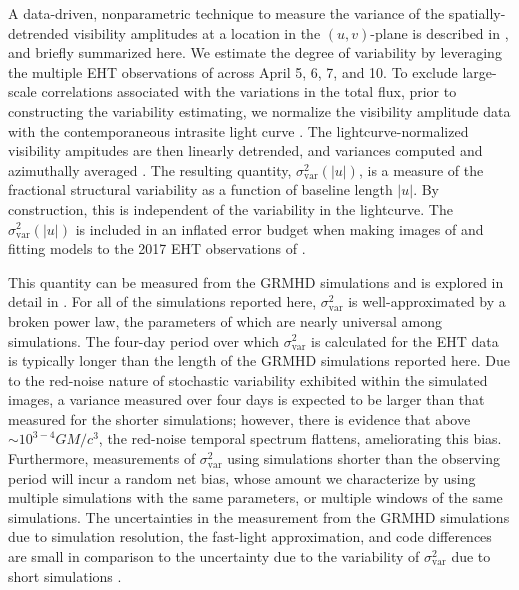 A data-driven, nonparametric technique to measure the variance of the spatially-detrended visibility amplitudes at a location in the $(u,v)$-plane is described in \citet{NoiseModeling}, and briefly summarized here.  We estimate the degree of variability by leveraging the multiple EHT observations of \sgra across April 5, 6, 7, and 10.  To exclude large-scale correlations associated with the variations in the total flux, prior to constructing the variability estimating, we normalize the visibility amplitude data with the contemporaneous intrasite light curve \citep{Georgiev_2022}.  The lightcurve-normalized visibility ampitudes are then linearly detrended, and variances computed and azimuthally averaged \citep{NoiseModeling}.  The resulting quantity, $\sigma_\text{var}^2 (|u|)$, is a measure of the fractional structural variability as a function of baseline length $|u|$.  By construction, this is independent of the variability in the lightcurve.  The $\sigma_\text{var}^2 (|u|)$ is included in an inflated error budget when making images of and fitting models to the 2017 EHT observations of \sgra {}.

This quantity can be measured from the GRMHD simulations and is explored in detail in \citet{Georgiev_2022}. For all of the simulations reported here, $\sigma_\text{var}^2$ is well-approximated by a broken power law, the parameters of which are nearly universal among simulations.
The four-day period over which $\sigma_\text{var}^2$ is calculated for the EHT data is typically longer than the length of the GRMHD simulations reported here. Due to the red-noise nature of stochastic variability exhibited within the simulated images, a variance measured over four days is expected to be larger than that measured for the shorter simulations; however, there is evidence that above $\sim 10^{3-4} GM/c^3$, the red-noise temporal spectrum flattens, ameliorating this bias.
Furthermore, measurements of $\sigma_\text{var}^2$ using simulations shorter than the observing period will incur a random net bias, whose amount we characterize by using multiple simulations with the same parameters, or multiple windows of the same simulations.
The uncertainties in the measurement from the GRMHD simulations due to simulation resolution, the fast-light approximation, and code differences are small in comparison to the uncertainty due to the variability of $\sigma_\text{var}^2$ due to short simulations \citep{Georgiev_2022}.

